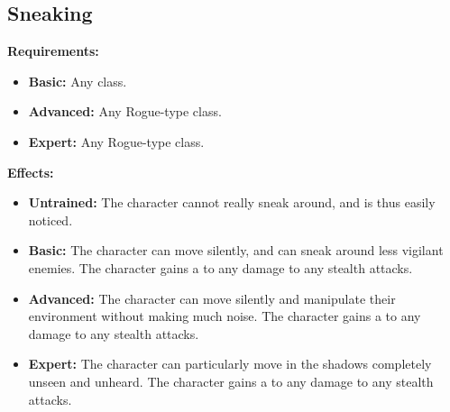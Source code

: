 \documentclass[openany,10pt,a4paper]{book}
\begin{document}
\subsection{Sneaking}
\begin{table}[!ht]
\centering
{}
\end{table}
\textbf{Requirements:}
\begin{itemize}
	\item \textbf{Basic:} Any class.
	\item \textbf{Advanced:} Any Rogue-type class.
	\item \textbf{Expert:} Any Rogue-type class.
\end{itemize}
\textbf{Effects:}
\begin{itemize}
	\item \textbf{Untrained:} The character cannot really sneak around, and is thus easily noticed.
	\item \textbf{Basic:} The character can move silently, and can sneak around less vigilant enemies. The character gains a  to any damage to any stealth attacks.
	\item \textbf{Advanced:} The character can move silently and manipulate their environment without making much noise. The character gains a  to any damage to any stealth attacks.
	\item \textbf{Expert:} The character can particularly move in the shadows completely unseen and unheard. The character gains a  to any damage to any stealth attacks.
\end{itemize}\newpage
\end{document}
